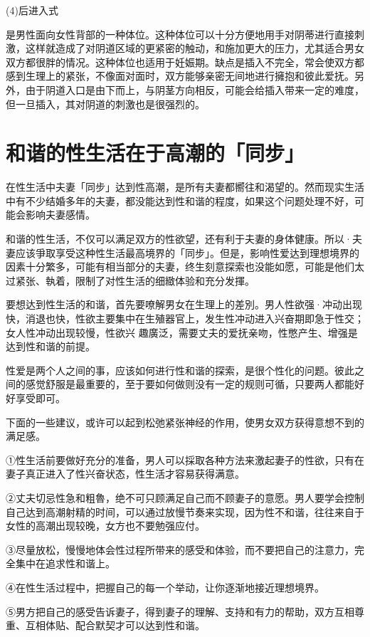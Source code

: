 \documentclass[12pt,UTF8]{ctexbook}
\begin{document}
(4)后进入式

是男性面向女性背部的一种体位。这种体位可以十分方便地用手对阴蒂进行直接刺激，这样就造成了对阴道区域的更紧密的触动，和施加更大的压力，尤其适合男女双方都很胖的情况。这种体位也适用于妊娠期。缺点是插入不完全，常会使双方都感到生理上的紧张，不像面对面时，双方能够亲密无间地进行擁抱和彼此爱抚。另外，由于阴道入口是由下而上，与阴茎方向相反，可能会给插入带来一定的难度，但一旦插入，其对阴道的刺激也是很强烈的。

\section{和谐的性生活在于高潮的「同步」}

在性生活中夫妻「同步」达到性高潮，是所有夫妻都嚮往和渴望的。然而现实生活中有不少结婚多年的夫妻，都没能达到性和谐的程度，如果这个问题处理不好，可能会影响夫妻感情。

和谐的性生活，不仅可以满足双方的性欲望，还有利于夫妻的身体健康。所以·夫妻应该爭取享受这种性生活最高境界的「同步」。但是，影响性爱达到理想境界的因素十分繁多，可能有相当部分的夫妻，终生刻意探索也没能如愿，可能是他们太过紧张、執着，限制了对性生活的细緻体验和充分发揮。

要想达到性生活的和谐，首先要嘹解男女在生理上的差別。男人性欲强·冲动出现快，消退也快，性欲主要集中在生殖器官上，发生性冲动进入兴奋期即急于性交；女人性冲动出现较慢，性欲兴
趣廣泛，需要丈夫的爱抚亲吻，性憋产生、增强是达到性和谐的前提。

性爱是两个人之间的事，应该如何进行性和谐的探索，是很个性化的问题。彼此之间的感觉舒服是最重要的，至于要如何做则没有一定的规则可循，只要两人都能好好享受即可。

下面的一些建议，或许可以起到松弛紧张神经的作用，使男女双方获得意想不到的满足感。

①性生活前要做好充分的准备，男人可以採取各种方法来激起妻子的性欲，只有在妻子真正进入了性兴奋状态，性生活才容易获得满意。

②丈夫切忌性急和粗魯，绝不可只顾满足自己而不顾妻子的意愿。男人要学会控制自己达到高潮射精的时间，可以通过放慢节奏来实现，因为性不和谐，往往来自于女性的高潮出现较晚，女方也不要勉强应付。

③尽量放松，慢慢地体会性过程所带来的感受和体验，而不要把自己的注意力，完全集中在追求性和谐上。

④在性生活过程中，把握自己的每一个举动，让你逐渐地接近理想境界。

⑤男方把自己的感受告诉妻子，得到妻子的理解、支持和有力的帮助，双方互相尊重、互相体贴、配合默契才可以达到性和谐。
\end{document}
